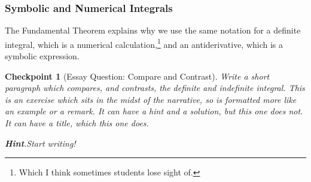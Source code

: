 \documentclass{sn-jnl}
\theoremstyle{thmstyleone}%
\theoremstyle{thmstyletwo}%
\newtheorem{inlineexercise}[theorem]{Checkpoint}
\theoremstyle{thmstylethree}%
\newcommand{\blocktitlefont}{\relax}
\numberwithin{equation}{section}
\begin{document}
\subsubsection{Symbolic and Numerical Integrals}\label{subsubsection-different-integrals}%
The Fundamental Theorem explains why we use the same notation for a definite integral, which is a numerical calculation,\footnote{Which I think sometimes students lose sight of.\label{subsubsection-different-integrals-2-1}} and an antiderivative, which is a symbolic expression.%
\begin{inlineexercise}[Essay Question: Compare and Contrast]\label{exercise-essay}%
%
Write a short paragraph which compares, and contrasts, the definite and indefinite integral. This is an exercise which sits in the midst of the narrative, so is formatted more like an example or a remark.  It can have a hint and a solution, but this one does not.  It can have a title, which this one does.%
\par\smallskip%
\noindent\textbf{\blocktitlefont Hint}.\hypertarget{exercise-essay-3}{}\quad{}Start writing!%
\end{inlineexercise}%
%
%
\typeout{************************************************}
\typeout{************************************************}
%
\end{document}
